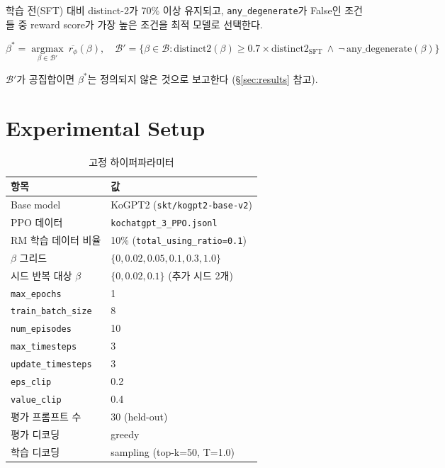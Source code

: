 \documentclass[conference]{IEEEtran}
\begin{document}
학습 전(SFT) 대비 distinct-2가 70\% 이상 유지되고, \texttt{any\_degenerate}가
False인 조건들 중 reward score가 가장 높은 조건을 최적 모델로 선택한다.

\begin{equation}
\beta^{*} = \operatorname*{argmax}_{\beta \in \mathcal{B}'} \
\overline{r_\phi}(\beta), \quad
\mathcal{B}' = \{\beta \in \mathcal{B} : \text{distinct2}(\beta) \geq
0.7 \times \text{distinct2}_{\text{SFT}} \ \land \ \lnot\,\text{any\_degenerate}(\beta)\}
\label{eq:selection}
\end{equation}

$\mathcal{B}'$가 공집합이면 $\beta^{*}$는 정의되지 않은 것으로 보고한다
(\S\ref{sec:results} 참고).

\section{Experimental Setup}

\begin{table}[h]
\centering
\caption{고정 하이퍼파라미터}
\label{tab:setup}
\begin{tabular}{@{}ll@{}}
\toprule
항목 & 값 \\
\midrule
Base model & KoGPT2 (\texttt{skt/kogpt2-base-v2}) \\
PPO 데이터 & \texttt{kochatgpt\_3\_PPO.jsonl} \\
RM 학습 데이터 비율 & 10\% (\texttt{total\_using\_ratio=0.1}) \\
$\beta$ 그리드 & $\{0, 0.02, 0.05, 0.1, 0.3, 1.0\}$ \\
시드 반복 대상 $\beta$ & $\{0, 0.02, 0.1\}$ (추가 시드 2개) \\
\texttt{max\_epochs} & 1 \\
\texttt{train\_batch\_size} & 8 \\
\texttt{num\_episodes} & 10 \\
\texttt{max\_timesteps} & 3 \\
\texttt{update\_timesteps} & 3 \\
\texttt{eps\_clip} & 0.2 \\
\texttt{value\_clip} & 0.4 \\
평가 프롬프트 수 & 30 (held-out) \\
평가 디코딩 & greedy \\
학습 디코딩 & sampling (top-k=50, T=1.0) \\
\bottomrule
\end{tabular}
\end{table}
\end{document}
